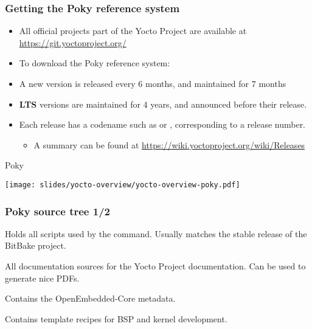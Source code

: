 \begin{frame}
  \frametitle{Getting the Poky reference system}
  \begin{itemize}
    \item All official projects part of the Yocto Project are
          available at \url{https://git.yoctoproject.org/}
    \item To download the Poky reference system: \\
          {\small
          }
    \item A new version is released every 6 months, and maintained for 7 months
    \item \textbf{LTS} versions are maintained for 4 years, and announced before their release.
    \item Each release has a codename such as  or ,
          corresponding to a release number.
                  \begin{itemize}
                          \item A summary can be found at \url{https://wiki.yoctoproject.org/wiki/Releases}
                  \end{itemize}
  \end{itemize}
\end{frame}

\begin{frame}{Poky}
  \begin{center}
    \texttt{[image: slides/yocto-overview/yocto-overview-poky.pdf]}
  \end{center}
\end{frame}

\begin{frame}
  \frametitle{Poky source tree 1/2}
  \begin{description}[style=nextline]
  \item[bitbake/] Holds all scripts used by the  command.
    Usually matches the stable release of the BitBake project.
  \item[documentation/] All documentation sources for the Yocto
    Project documentation. Can be used to generate nice PDFs.
  \item[meta/] Contains the OpenEmbedded-Core metadata.
  \item[meta-skeleton/] Contains template recipes for BSP and
    kernel development.
  \end{description}
\end{frame}

